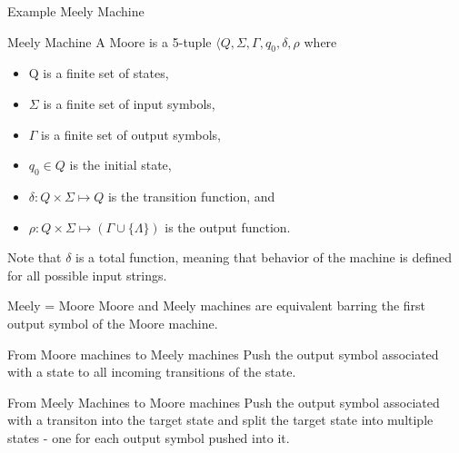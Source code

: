 \documentclass{beamer}
\begin{document}
\begin{frame}{Example Meely Machine}
\begin{center}
%
\end{center}
\end{frame}

\begin{frame}{Meely Machine}
A Moore is a 5-tuple $\langle Q, \Sigma, \Gamma, q_0, \delta, \rho$ where
\begin{itemize}
  \item Q is a finite set of states,
  \item $\Sigma$ is a finite set of input symbols,
  \item $\Gamma$ is a finite set of output symbols,
  \item $q_0\in Q$ is  the initial state,
  \item $\delta:Q\times \Sigma\mapsto Q$ is the transition function, and 
  \item $\rho:Q\times\Sigma\mapsto (\Gamma\cup\{\Lambda\})$ is  the output function.
\end{itemize}
Note that $\delta$ is a total function,
meaning that behavior of the machine is defined
for all possible input strings. 
\end{frame}

\begin{frame}{Meely = Moore}
Moore and Meely machines are equivalent barring the first output symbol of the Moore machine. 
\end{frame}

\begin{frame}{From Moore machines to Meely machines} 
Push the output symbol associated with a state to all incoming transitions of the state.  

\end{frame}


\begin{frame}{From Meely Machines to Moore machines}
Push the output symbol associated with a transiton into the target state 
and split the target state into multiple states 
- one for each output symbol pushed into it. 

\end{frame}
\end{document}
